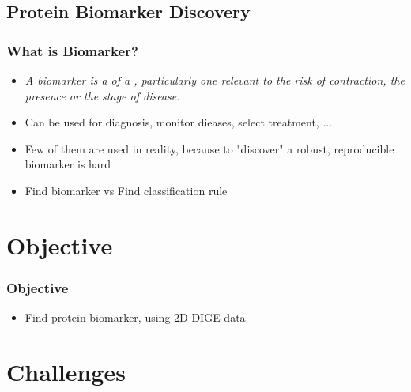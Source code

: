 \documentclass{beamer}
\begin{document}
\subsection{Protein Biomarker Discovery} %
\begin{frame}
\frametitle{What is Biomarker?}
\begin{itemize}
\item \textit{A biomarker is a  of a , particularly one relevant to the risk of contraction, the presence or the stage of disease.}\cite{rifai2006protein}
\item Can be used for diagnosis, monitor dieases, select treatment, ...
\item Few of them are used in reality, because to "discover" a robust, reproducible biomarker is hard
\item Find biomarker vs Find classification rule
\end{itemize}
\end{frame}

\section{Objective} %
\begin{frame}
\frametitle{Objective}
\begin{itemize}
\item Find protein biomarker, using 2D-DIGE data
\end{itemize}
\end{frame}

\section{Challenges}
\end{document}
